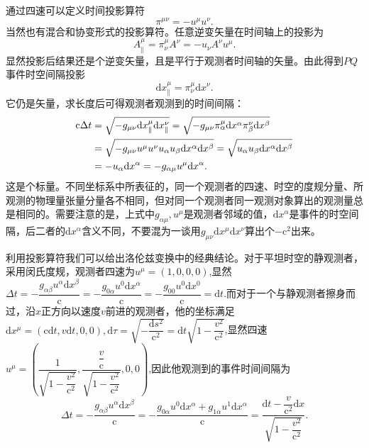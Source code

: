 \documentclass[11pt, a4paper, oneside, onecolumn]{ctexart}
\numberwithin{equation}{subsection}
\begin{document}
通过四速可以定义时间投影算符
\begin{equation}
\pi^{\mu\nu}=-u^{\mu}u^{\nu}.
\end{equation}
当然也有混合和协变形式的投影算符。任意逆变矢量在时间轴上的投影为
\begin{equation}
A^{\mu}_{\parallel}=\pi^{\mu}_{\nu}A^{\nu}=-u_{\nu}A^{\nu}u^{\mu}.
\end{equation}
显然投影后结果还是个逆变矢量，且是平行于观测者时间轴的矢量。由此得到$PQ$事件时空间隔投影
\begin{equation}
\mathrm{d}x^{\mu}_{\parallel}=\pi^{\mu}_{\nu}\mathrm{d}x^{\nu}.
\end{equation}
它仍是矢量，求长度后可得观测者观测到的时间间隔：
\begin{align}
\mathrm{c}\Delta{}t&=\sqrt{-g_{\mu\nu}\mathrm{d}x^{\mu}_{\parallel}\mathrm{d}x^{\nu}_{\parallel}}=\sqrt{-g_{\mu\nu}\pi^{\mu}_{\alpha}\mathrm{d}x^{\alpha}\pi^{\nu}_{\beta}\mathrm{d}x^{\beta}}\notag\\
&=\sqrt{-g_{\mu\nu}u^{\mu}u^{\nu}u_{\alpha}u_{\beta}\mathrm{d}x^{\alpha}\mathrm{d}x^{\beta}}=\sqrt{u_{\alpha}u_{\beta}\mathrm{d}x^{\alpha}\mathrm{d}x^{\beta}}\notag\\
&=-u_{\alpha}\mathrm{d}x^{\alpha}=-g_{\alpha\mu}u^{\mu}\mathrm{d}x^{\alpha}.
\end{align}
这是个标量。不同坐标系中所表征的，同一个观测者的四速、时空的度规分量、所观测的物理量张量分量各不相同，但对同一个观测者同一观测对象算出的观测量总是相同的。需要注意的是，上式中$g_{\alpha\mu},u^{\mu}$是观测者邻域的值，$\mathrm{d}x^{\alpha}$是事件的时空间隔，后二者的$\mathrm{d}x^{\alpha}$含义不同，不要混为一谈用$g_{\mu\nu}\mathrm{d}x^{\mu}\mathrm{d}x^{\nu}$算出个$-\mathrm{c}^{2}$出来。

利用投影算符我们可以给出洛伦兹变换中的经典结论。对于平坦时空的静观测者，采用闵氏度规，观测者四速为$u^{\mu}=\left(1,0,0,0\right)$,显然$\Delta{}t=-\dfrac{g_{\alpha\beta}u^{\alpha}\mathrm{d}x^{\beta}}{\mathrm{c}}=-\dfrac{g_{0\alpha}u^{0}\mathrm{d}x^{\alpha}}{\mathrm{c}}=-\dfrac{g_{00}u^{0}\mathrm{d}x^{0}}{\mathrm{c}}=\mathrm{d}t$.而对于一个与静观测者擦身而过，沿$x$正方向以速度$v$前进的观测者，他的坐标满足$\mathrm{d}x^{\mu}=\left(\mathrm{c}\mathrm{d}t,v\mathrm{d}t,0,0\right),\mathrm{d}\tau=\sqrt{-\dfrac{\mathrm{d}s^{2}}{\mathrm{c}^{2}}}=\mathrm{d}t\sqrt{1-\dfrac{v^{2}}{\mathrm{c}^{2}}}$,显然四速$u^{\mu}=\left(\dfrac{1}{\sqrt{1-\dfrac{v^{2}}{\mathrm{c}^{2}}}},\dfrac{\dfrac{v}{\mathrm{c}}}{\sqrt{1-\dfrac{v^{2}}{\mathrm{c}^{2}}}},0,0\right)$,因此他观测到的事件时间间隔为
\begin{equation}
\Delta{}t=-\frac{g_{\alpha\beta}u^{\alpha}\mathrm{d}x^{\beta}}{\mathrm{c}}=-\frac{g_{0\alpha}u^{0}\mathrm{d}x^{\alpha}+g_{1\alpha}u^{1}\mathrm{d}x^{\alpha}}{\mathrm{c}}=\frac{\mathrm{d}t-\dfrac{v}{\mathrm{c}^{2}}\mathrm{d}x}{\sqrt{1-\dfrac{v^{2}}{\mathrm{c}^{2}}}}.
\end{equation}
\end{document}
